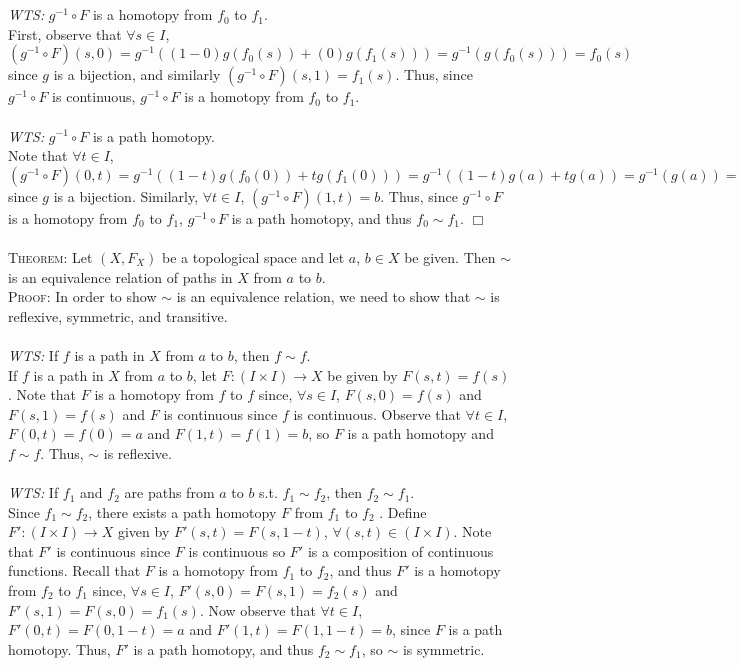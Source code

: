 \documentclass[12pt]{article}
\begin{document}
\\ \\\textit{WTS:} $g^{-1} \circ F$ is a homotopy from $f_0$ to $f_1$.
\\First, observe that $\forall s \in I$, $(g^{-1} \circ F)(s,0) = g^{-1}((1-0)g(f_0(s)) + (0)g(f_1(s))) = g^{-1}(g(f_0(s))) = f_0(s)$ since $g$ is a bijection, and similarly $(g^{-1} \circ F)(s, 1) = f_1(s)$. Thus, since $g^{-1} \circ F$ is continuous, $g^{-1} \circ F$ is a homotopy from $f_0$ to $f_1$.
\\ \\\textit{WTS:} $g^{-1} \circ F$ is a path homotopy.
\\Note that $\forall t \in I$, $(g^{-1} \circ F)(0, t) = g^{-1}((1-t)g(f_0(0)) + tg(f_1(0))) = g^{-1}((1-t)g(a) + tg(a)) = g^{-1}(g(a)) = a$ since $g$ is a bijection. Similarly, $\forall t \in I$, $(g^{-1} \circ F)(1,t) = b$. Thus, since $g^{-1} \circ F$ is a homotopy from $f_0$ to $f_1$, $g^{-1} \circ F$ is a path homotopy, and thus $f_0 \sim f_1$. $\Box$
\\ \\\textsc{Theorem:} Let $(X, F_X)$ be a topological space and let $a$, $b \in X$ be given. Then $\sim$ is an equivalence relation of paths in $X$ from $a$ to $b$.
\\\textsc{Proof:} In order to show $\sim$ is an equivalence relation, we need to show that $\sim$ is reflexive, symmetric, and transitive.
\\ \\\textit{WTS:} If $f$ is a path in $X$ from $a$ to $b$, then $f \sim f$.
\\If $f$ is a path in $X$ from $a$ to $b$, let $F: (I \times I) \rightarrow X$ be given by $F(s,t) = f(s)$. Note that $F$ is a homotopy from $f$ to $f$ since, $\forall s \in I$, $F(s,0) = f(s)$ and $F(s,1) = f(s)$ and $F$ is continuous since $f$ is continuous. Observe that $\forall t \in I$, $F(0, t) = f(0) = a$ and $F(1, t) = f(1) = b$, so $F$ is a path homotopy and $f \sim f$. Thus, $\sim$ is reflexive.
\\ \\\textit{WTS:} If $f_1$ and $f_2$ are paths from $a$ to $b$ s.t. $f_1 \sim f_2$, then $f_2 \sim f_1$.
\\Since $f_1 \sim f_2$, there exists a path homotopy $F$ from $f_1$ to $f_2$ . Define $F': (I \times I) \rightarrow X$ given by $F'(s,t) = F(s, 1-t)$, $\forall (s,t) \in (I \times I)$. Note that $F'$ is continuous since $F$ is continuous so $F'$ is a composition of continuous functions. Recall that $F$ is a homotopy from $f_1$ to $f_2$, and thus $F'$ is a homotopy from $f_2$ to $f_1$ since,  $\forall s \in I$, $F'(s, 0) = F(s, 1) = f_2(s)$ and $F'(s, 1) = F(s, 0) = f_1(s)$. Now observe that $\forall t \in I$, $F'(0,t) = F(0,1-t) = a$ and $F'(1,t) = F(1, 1-t) = b$, since $F$ is a path homotopy. Thus, $F'$ is a path homotopy, and thus $f_2 \sim f_1$, so $\sim$ is symmetric.
\end{document}
